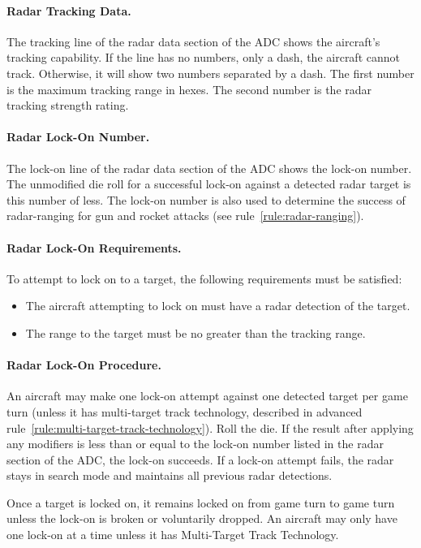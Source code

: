 {\paragraph{Radar Tracking Data.} The tracking line of the radar data section of the ADC shows the aircraft's tracking capability. If the line has no numbers, only a dash, the aircraft cannot track. Otherwise, it will show two numbers separated by a dash. The first number is the maximum tracking range in hexes. The second number is the radar tracking strength rating. 

\paragraph{Radar Lock-On Number.} The lock-on line of the radar data section of the ADC shows the lock-on number. The unmodified die roll for a successful lock-on against a detected radar target is this number of less. The lock-on number is also used to determine the success of radar-ranging for gun and rocket attacks (see rule~\ref{rule:radar-ranging}).

\paragraph{Radar Lock-On Requirements.} To attempt to lock on to a target, the following requirements must be satisfied:
\begin{itemize}
\item The aircraft attempting to lock on must have a radar detection of the target.
\item The range to the target must be no greater than the tracking range.
\end{itemize}

\paragraph{Radar Lock-On Procedure.} An aircraft may make one lock-on attempt against one detected target per game turn (unless it has multi-target track technology, described in advanced rule~\ref{rule:multi-target-track-technology}). Roll the die. If the result after applying any modifiers is less than or equal to the lock-on number listed in the radar section of the ADC, the lock-on succeeds. If a lock-on attempt fails, the radar stays in search mode and maintains all previous radar detections.

Once a target is locked on, it remains locked on from game turn to game turn unless the lock-on is broken or voluntarily dropped. An aircraft may only have one lock-on at a time unless it has Multi-Target Track Technology.

}
